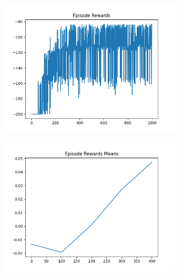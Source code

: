 \begin{figure}[H]
\begin{subfigure}{.47\linewidth}
        \includegraphics[width=\textwidth]{mountain/2024-06-15_13-56-21_dqn_mountaincar_episode_rewards.png}
    \end{subfigure}
    \begin{subfigure}{.47\linewidth}
        \centering
        \includegraphics[width=\textwidth]{mountain/2024-06-15_08-13-32_dqn_mountaincar_episode_rewards_means.png}
    \end{subfigure}
\end{figure}
